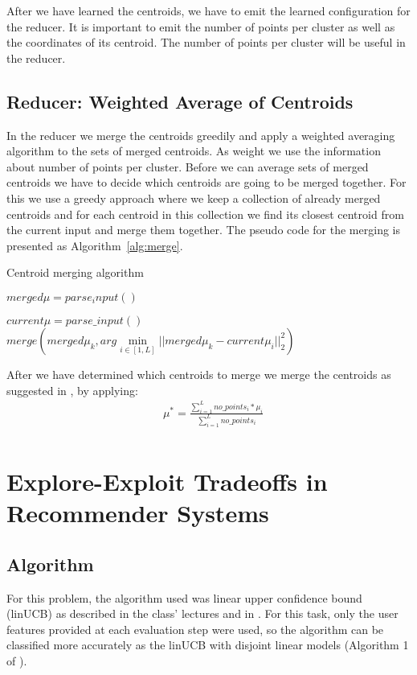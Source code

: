 \documentclass[a4paper, 11pt]{article}
\begin{document}
After we have learned the centroids, we have to emit the learned configuration for the reducer. It is important to emit the number of points per cluster as well as the coordinates of its centroid. The number of points per cluster will be useful in the reducer.

\subsection{Reducer: Weighted Average of Centroids}
In the reducer we merge the centroids greedily and apply a weighted averaging algorithm to the sets of merged centroids. As weight we use the information about number of points per cluster. Before we can average sets of merged centroids we have to decide which centroids are going to be merged together. For this we use a greedy approach where we keep a collection of already merged centroids and for each centroid in this collection we find its closest centroid from the current input and merge them together. The pseudo code for the merging is presented as Algorithm~\ref{alg:merge}. 
\begin{algorithm}{}\label{alg:merge}
\caption{Centroid merging algorithm}
\begin{algorithmic}[1]
\State $merged\mu = parse_input()$

\State $current\mu = parse\_input()$
                \State $merge(merged\mu_k, arg\min \limits_{i \in [1,L]}||merged\mu_k-current\mu_i||_2^2)$
        \EndFor
\EndFor
\end{algorithmic}
\end{algorithm}

After we have determined which centroids to merge we merge the centroids as suggested in \cite{ullman}, by applying:
\begin{align*}
&\mu^* = \frac{\sum\limits_{i=1}^{L} no\_points_i * \mu_i}{\sum\limits_{i=1}^{L} no\_points_i} \\
\end{align*}

\clearpage
\section{Explore-Exploit Tradeoffs in Recommender Systems}

\subsection{Algorithm}
For this problem, the algorithm used was linear upper confidence bound (linUCB) as described in the class' lectures and in \cite{li2010contextual}. For this task, only the user features provided at each evaluation step were used, so the algorithm can be classified more accurately as the linUCB with disjoint linear models (Algorithm 1 of  \cite{li2010contextual}).
\end{document}

